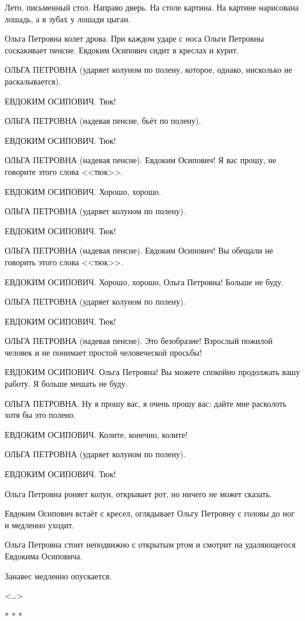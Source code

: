 Лето, письменный стол. Направо дверь. На столе картина. На картине нарисована лошадь, а в зубах у лошади цыган.

Ольга Петровна колет дрова. При каждом ударе с носа Ольги Петровны соскакивает пенсне. Евдоким Осипович сидит в креслах и курит.

ОЛЬГА ПЕТРОВНА (ударяет колуном по полену, которое, однако, нисколько не раскалывается).

ЕВДОКИМ ОСИПОВИЧ. Тюк!

ОЛЬГА ПЕТРОВНА (надевая пенсне, бьёт по полену).

ЕВДОКИМ ОСИПОВИЧ. Тюк!

ОЛЬГА ПЕТРОВНА (надевая пенсне). Евдоким Осипович! Я вас прошу, не говорите этого слова <<тюк>>.

ЕВДОКИМ ОСИПОВИЧ. Хорошо, хорошо.

ОЛЬГА ПЕТРОВНА (ударяет колуном по полену).

ЕВДОКИМ ОСИПОВИЧ. Тюк!

ОЛЬГА ПЕТРОВНА (надевая пенсне). Евдоким Осипович! Вы обещали не говорить этого слова <<тюк>>.

ЕВДОКИМ ОСИПОВИЧ. Хорошо, хорошо, Ольга Петровна! Больше не буду.

ОЛЬГА ПЕТРОВНА (ударяет колуном по полену).

ЕВДОКИМ ОСИПОВИЧ. Тюк!

ОЛЬГА ПЕТРОВНА (надевая пенсне). Это безобразие! Взрослый пожилой человек и не понимает простой человеческой просьбы!

ЕВДОКИМ ОСИПОВИЧ. Ольга Петровна! Вы можете спокойно продолжать вашу работу. Я больше мешать не буду.

ОЛЬГА ПЕТРОВНА. Ну я прошу вас, я очень прошу вас: дайте мне расколоть хотя бы это полено.

ЕВДОКИМ ОСИПОВИЧ. Колите, конечно, колите!

ОЛЬГА ПЕТРОВНА (ударяет колуном по полену).

ЕВДОКИМ ОСИПОВИЧ. Тюк!

Ольга Петровна роняет колун, открывает рот, но ничего не может сказать.

Евдоким Осипович встаёт с кресел, оглядывает Ольгу Петровну с головы до ног и медленно уходит.

Ольга Петровна стоит неподвижно с открытым ртом и смотрит на удаляющегося Евдокима Осиповича.

\begin{center}
Занавес медленно опускается.
\end{center}

\begin{flushright}
<\dots{}>
\end{flushright}

\begin{center}
* * *   
\end{center}
